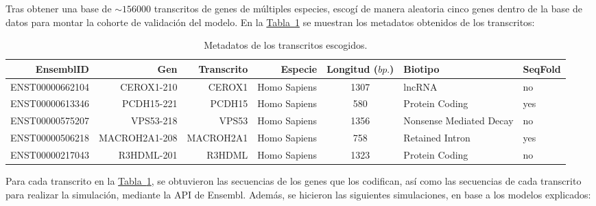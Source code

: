 \documentclass[a4paper,11pt,titlepage]{article}
\newcommand{\nr}[2][sección]{\hyperref[#2]{#1~\ref{#2}}}
\theoremstyle{definition}
\begin{document}
Tras obtener una base de $\sim156000$ transcritos de genes de múltiples especies, escogí de manera aleatoria cinco genes dentro de la base de datos para montar la cohorte de validación del modelo. En la \nr[Tabla]{tab:transcripts} se muestran los metadatos obtenidos de los transcritos:

\begin{table}[H]
	\centering
    \begin{adjustbox}{width=\textwidth}
	\begin{tabular}{rrrrcll}
	    \toprule
        EnsemblID & Gen & Transcrito & Especie & Longitud ($bp.$) & Biotipo & SeqFold \\
		\midrule
        ENST00000662104 & CEROX1-210 & CEROX1 & Homo Sapiens & 1307 & lncRNA & no \\
        ENST00000613346 & PCDH15-221 & PCDH15 & Homo Sapiens & 580
        & Protein Coding  & yes \\
        ENST00000575207 & VPS53-218 & VPS53 & Homo Sapiens & 1356
        & Nonsense Mediated Decay & no \\
        ENST00000506218 & MACROH2A1-208 & MACROH2A1 & Homo Sapiens & 758 & Retained Intron & yes \\
        ENST00000217043 & R3HDML-201 & R3HDML & Homo Sapiens & 1323 & Protein Coding & no \\
		\bottomrule
	\end{tabular}
    \end{adjustbox}
	\caption{Metadatos de los transcritos escogidos.}
    \label{tab:transcripts}
\end{table}

Para cada transcrito en la \nr[Tabla]{tab:transcripts}, se obtuvieron las secuencias de los genes que los codifican, así como las secuencias de cada transcrito para realizar la simulación, mediante la API de Ensembl. Además, se hicieron las siguientes simulaciones, en base a los modelos explicados: 
\end{document}
